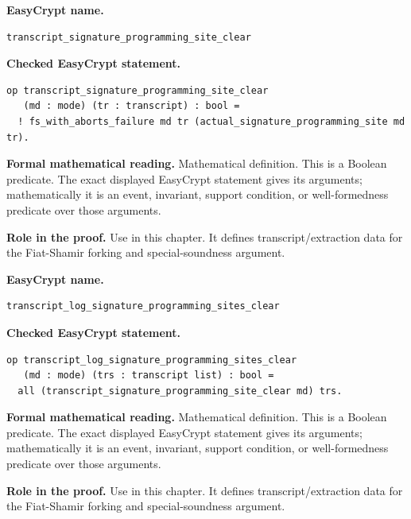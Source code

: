\begin{formaldefinition}
\noindent\textbf{EasyCrypt name.}
\begin{lstlisting}[language=EasyCrypt,basicstyle=\ttfamily\scriptsize]
transcript_signature_programming_site_clear
\end{lstlisting}
\noindent\textbf{Checked EasyCrypt statement.}
\begin{lstlisting}[language=EasyCrypt,basicstyle=\ttfamily\scriptsize]
op transcript_signature_programming_site_clear
   (md : mode) (tr : transcript) : bool =
  ! fs_with_aborts_failure md tr (actual_signature_programming_site md tr).
\end{lstlisting}
\noindent\textbf{Formal mathematical reading.}
Mathematical definition. This is a Boolean predicate.  The exact displayed EasyCrypt statement gives its arguments; mathematically it is an event, invariant, support condition, or well-formedness predicate over those arguments.

\noindent\textbf{Role in the proof.}
Use in this chapter. It defines transcript/extraction data for the Fiat-Shamir forking and special-soundness argument.

\end{formaldefinition}

\begin{formaldefinition}
\noindent\textbf{EasyCrypt name.}
\begin{lstlisting}[language=EasyCrypt,basicstyle=\ttfamily\scriptsize]
transcript_log_signature_programming_sites_clear
\end{lstlisting}
\noindent\textbf{Checked EasyCrypt statement.}
\begin{lstlisting}[language=EasyCrypt,basicstyle=\ttfamily\scriptsize]
op transcript_log_signature_programming_sites_clear
   (md : mode) (trs : transcript list) : bool =
  all (transcript_signature_programming_site_clear md) trs.
\end{lstlisting}
\noindent\textbf{Formal mathematical reading.}
Mathematical definition. This is a Boolean predicate.  The exact displayed EasyCrypt statement gives its arguments; mathematically it is an event, invariant, support condition, or well-formedness predicate over those arguments.

\noindent\textbf{Role in the proof.}
Use in this chapter. It defines transcript/extraction data for the Fiat-Shamir forking and special-soundness argument.

\end{formaldefinition}

